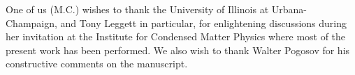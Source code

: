 \documentclass[epj]{svjour}
\begin{document}
One of us (M.C.) wishes to thank the University of Illinois at
Urbana-Champaign, and Tony Leggett in particular, for enlightening discussions during her invitation at
the Institute for Condensed Matter Physics where most of the present work has been
performed. We also wish to thank Walter Pogosov for his constructive comments on the manuscript.




\end{document}
